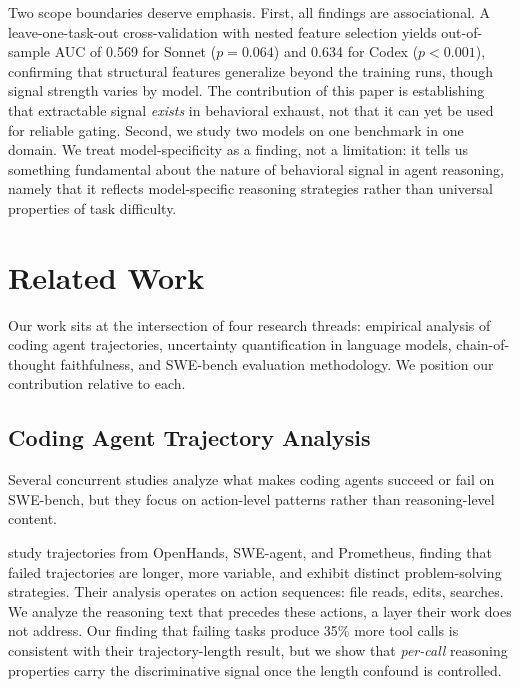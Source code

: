 \documentclass[11pt]{article}
\begin{document}
Two scope boundaries deserve emphasis.
First, all findings are associational.
A leave-one-task-out cross-validation with nested feature selection yields out-of-sample AUC of 0.569 for Sonnet ($p = 0.064$) and 0.634 for Codex ($p < 0.001$), confirming that structural features generalize beyond the training runs, though signal strength varies by model.
The contribution of this paper is establishing that extractable signal \emph{exists} in behavioral exhaust, not that it can yet be used for reliable gating.
Second, we study two models on one benchmark in one domain.
We treat model-specificity as a finding, not a limitation: it tells us something fundamental about the nature of behavioral signal in agent reasoning, namely that it reflects model-specific reasoning strategies rather than universal properties of task difficulty.


\section{Related Work}
\label{sec:related}

Our work sits at the intersection of four research threads: empirical analysis of coding agent trajectories, uncertainty quantification in language models, chain-of-thought faithfulness, and SWE-bench evaluation methodology.
We position our contribution relative to each.

\subsection{Coding Agent Trajectory Analysis}

Several concurrent studies analyze what makes coding agents succeed or fail on SWE-bench, but they focus on action-level patterns rather than reasoning-level content.

\citet{majgaonkar2025understanding} study trajectories from OpenHands, SWE-agent, and Prometheus, finding that failed trajectories are longer, more variable, and exhibit distinct problem-solving strategies.
Their analysis operates on action sequences: file reads, edits, searches.
We analyze the reasoning text that precedes these actions, a layer their work does not address.
Our finding that failing tasks produce 35\% more tool calls is consistent with their trajectory-length result, but we show that \emph{per-call} reasoning properties carry the discriminative signal once the length confound is controlled.
\end{document}
